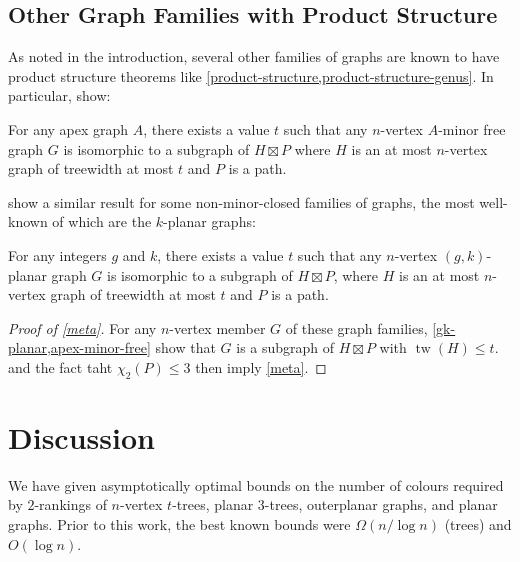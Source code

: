 \documentclass[kpfonts]{patmorin}
\DeclareMathOperator{\tw}{tw}
\newcommand{\trn}{\chi_2}
\theoremstyle{named}
\begin{document}
\subsection{Other Graph Families with Product Structure}

As noted in the introduction, several other families of graphs are known to have product structure theorems like \cref{product-structure,product-structure-genus}.  In particular, \citet{dujmovic.joret.ea:planar} show:

\begin{thm}\label{apex-minor-free}
    For any apex graph $A$, there exists a value $t$ such that any $n$-vertex $A$-minor free graph $G$ is isomorphic to a subgraph of $H\boxtimes P$ where $H$ is an at most $n$-vertex graph of treewidth at most $t$ and $P$ is a path.
\end{thm}

\citet{dujmovic.morin.ea:structure} show a similar result for some non-minor-closed families of graphs, the most well-known of which are the $k$-planar graphs:

\begin{thm}\label{gk-planar}
    For any integers $g$ and $k$, there exists a value $t$ such that any $n$-vertex $(g,k)$-planar graph $G$ is isomorphic to a subgraph of $H\boxtimes P$, where $H$ is an at most $n$-vertex graph of treewidth at most $t$ and $P$ is a path.
\end{thm}

\begin{proof}[Proof of \cref{meta}]
    For any $n$-vertex member $G$ of these graph families, \cref{gk-planar,apex-minor-free} show that $G$ is a subgraph of $H\boxtimes P$ with $\tw(H)\le t$.   and the fact taht $\trn(P)\le 3$ then imply \cref{meta}.
\end{proof}

\section{Discussion}
\label{conclusion}

We have given asymptotically optimal bounds on the number of colours required by $2$-rankings of $n$-vertex $t$-trees, planar 3-trees, outerplanar graphs, and planar graphs.  Prior to this work, the best known bounds were $\Omega(n/\log n)$ (trees) and $O(\log n)$.
\end{document}

